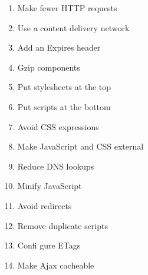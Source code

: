\documentclass{acm_proc_article-sp}
\begin{document}
\begin{enumerate}
	\item Make fewer HTTP requests
	\item Use a content delivery network
	\item Add an Expires header
	\item Gzip components
	\item Put stylesheets at the top
	\item Put scripts at the bottom
	\item Avoid CSS expressions
	\item Make JavaScript and CSS external
	\item Reduce DNS lookups
	\item Minify JavaScript
	\item Avoid redirects
	\item Remove duplicate scripts
	\item Confi gure ETags
	\item Make Ajax cacheable
\end{enumerate}




\end{document}
